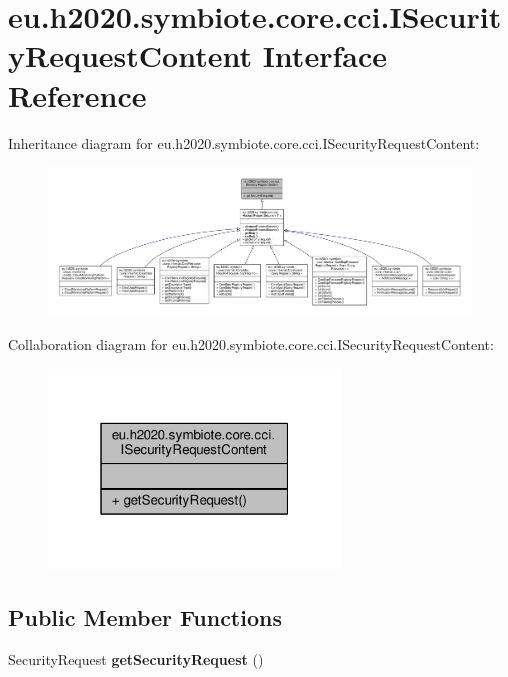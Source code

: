 \hypertarget{interfaceeu_1_1h2020_1_1symbiote_1_1core_1_1cci_1_1ISecurityRequestContent}{}\section{eu.\+h2020.\+symbiote.\+core.\+cci.\+I\+Security\+Request\+Content Interface Reference}
\label{interfaceeu_1_1h2020_1_1symbiote_1_1core_1_1cci_1_1ISecurityRequestContent}


Inheritance diagram for eu.\+h2020.\+symbiote.\+core.\+cci.\+I\+Security\+Request\+Content\+:
\nopagebreak
\begin{figure}[H]
\begin{center}
\leavevmode
\includegraphics[width=350pt]{interfaceeu_1_1h2020_1_1symbiote_1_1core_1_1cci_1_1ISecurityRequestContent__inherit__graph}
\end{center}
\end{figure}


Collaboration diagram for eu.\+h2020.\+symbiote.\+core.\+cci.\+I\+Security\+Request\+Content\+:
\nopagebreak
\begin{figure}[H]
\begin{center}
\leavevmode
\includegraphics[width=220pt]{interfaceeu_1_1h2020_1_1symbiote_1_1core_1_1cci_1_1ISecurityRequestContent__coll__graph}
\end{center}
\end{figure}
\subsection*{Public Member Functions}
\begin{DoxyCompactItemize}
\item 
\mbox{\label{interfaceeu_1_1h2020_1_1symbiote_1_1core_1_1cci_1_1ISecurityRequestContent_af1bb20cb8816623326d34865ffbf64d3}} 
Security\+Request {\bfseries get\+Security\+Request} ()
\end{DoxyCompactItemize}


